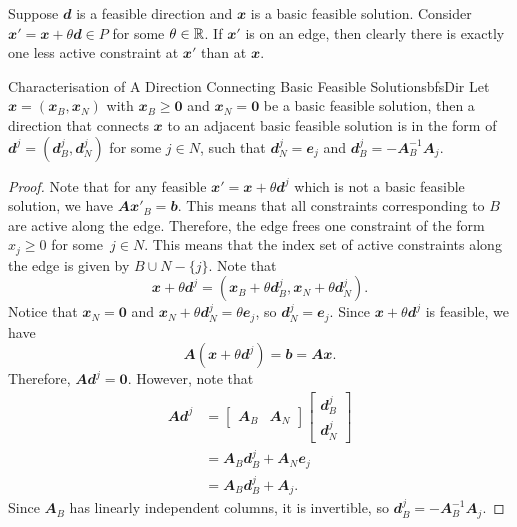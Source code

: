 \documentclass[math, code]{amznotes}
\theoremstyle{remark}
\begin{document}
Suppose $\mathbfit{d}$ is a feasible direction and $\mathbfit{x}$ is a basic feasible solution. Consider $\mathbfit{x}' = \mathbfit{x} + \theta\mathbfit{d} \in P$ for some $\theta \in \mathbb{R}$. If $\mathbfit{x}'$ is on an edge, then clearly there is exactly one less active constraint at $\mathbfit{x}'$ than at $\mathbfit{x}$.
\begin{thmbox}{\small Characterisation of A Direction Connecting Basic Feasible Solutions}{bfsDir}
    Let $\mathbfit{x} = (\mathbfit{x}_B, \mathbfit{x}_N)$ with $\mathbfit{x}_B \geq \mathbf{0}$ and $\mathbfit{x}_N = \mathbf{0}$ be a basic feasible solution, then a direction that connects $\mathbfit{x}$ to an adjacent basic feasible solution is in the form of $\mathbfit{d}^j = \left(\mathbfit{d}^j_B, \mathbfit{d}^j_N\right)$ for some $j \in N$, such that $\mathbfit{d}^j_N = \mathbfit{e}_j$ and $\mathbfit{d}^j_B = -\mathbfit{A}_B^{-1}\mathbfit{A}_j$.
    \tcblower
    \begin{proof}
        Note that for any feasible $\mathbfit{x}' = \mathbfit{x} + \theta\mathbfit{d}^j$ which is not a basic feasible solution, we have $\mathbfit{Ax}'_B = \mathbfit{b}$. This means that all constraints corresponding to $B$ are active along the edge. Therefore, the edge frees one constraint of the form $x_j \geq 0$ for some~$j \in N$. This means that the index set of active constraints along the edge is given by $B \cup N - \{j\}$. Note that 
        \begin{equation*}
            \mathbfit{x} + \theta\mathbfit{d}^j = \left(\mathbfit{x}_B + \theta\mathbfit{d}^j_B, \mathbfit{x}_N + \theta\mathbfit{d}^j_N\right).
        \end{equation*}
        Notice that $\mathbfit{x}_N = \mathbf{0}$ and $\mathbfit{x}_N + \theta\mathbfit{d}^j_N = \theta\mathbfit{e}_j$, so $\mathbfit{d}^j_N = \mathbfit{e}_j$. Since $\mathbfit{x} + \theta\mathbfit{d}^j$ is feasible, we have
        \begin{equation*}
            \mathbfit{A}\left(\mathbfit{x} + \theta\mathbfit{d}^j\right) = \mathbfit{b} = \mathbfit{Ax}.
        \end{equation*}
        Therefore, $\mathbfit{Ad}^j = \mathbf{0}$. However, note that
        \begin{align*}
            \mathbfit{Ad}^j & = \begin{bmatrix}
                \mathbfit{A}_B & \mathbfit{A}_N
            \end{bmatrix}\begin{bmatrix}
                \mathbfit{d}^j_B \\
                \mathbfit{d}^j_N
            \end{bmatrix} \\
            & = \mathbfit{A}_B\mathbfit{d}^j_B + \mathbfit{A}_N\mathbfit{e}_j \\
            & = \mathbfit{A}_B\mathbfit{d}^j_B + \mathbfit{A}_j.
        \end{align*}
        Since $\mathbfit{A}_B$ has linearly independent columns, it is invertible, so $\mathbfit{d}^j_B = -\mathbfit{A}_B^{-1}\mathbfit{A}_j$.
    \end{proof}
\end{thmbox}
\end{document}
